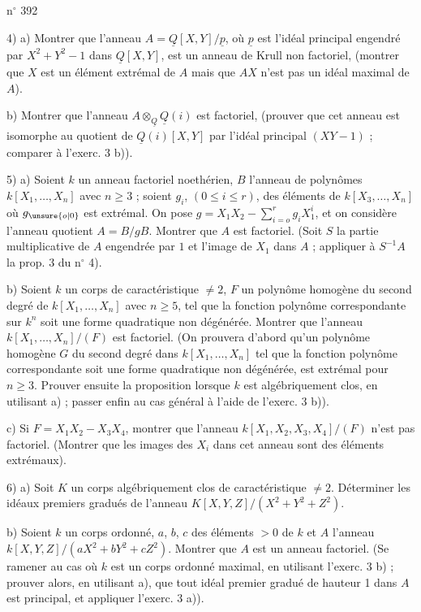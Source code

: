 \hfill n$^{\circ}$ 392

4) \qquad a) Montrer que l'anneau $A=\underline{Q}[X,Y]/\underline{p}$, où $\underline{p}$ est l'idéal principal engendré par $X^2+Y^2-1$ dans $\underline{Q}[X,Y]$, est un anneau de Krull non factoriel, (montrer que $X$ est un élément extrémal de $A$ mais que $AX$ n'est pas un idéal maximal de $A$).

b) Montrer que l'anneau $A\otimes_{\underline{Q}}\underline{Q}(i)$ est factoriel, (prouver que cet anneau est isomorphe au quotient de $\underline{Q}(i)[X,Y]$ par l'idéal principal $(XY-1)$ ; comparer à l'exerc. 3 b)).

5) \qquad a) Soient $k$ un anneau factoriel noethérien, $B$ l'anneau de polynômes $k[X_1,\ldots,X_n]$ avec $n\geq 3$ ; soient $g_i$, $(0\leq i\leq r)$, des éléments de $k[X_3,\ldots,X_n]$ où $g_{\unsure{o|0}}$ est extrémal. On pose $g=X_1X_2-\sum_{i=o}^{r}g_iX_1^{i}$, et on considère l'anneau quotient $A=B/gB$. Montrer que $A$ est factoriel. (Soit $S$ la partie multiplicative de $A$ engendrée par $1$ et l'image de $X_1$ dans $A$ ; appliquer à $S^{-1}A$ la prop. 3 du n$^{\circ}$ 4).

b) Soient $k$ un corps de caractéristique $\ne 2$, $F$ un polynôme homogène du second degré de $k[X_1,\ldots,X_n]$ avec $n\geq 5$, tel que la fonction polynôme correspondante sur $k^n$ soit une forme quadratique non dégénérée. Montrer que l'anneau $k[X_1,\ldots,X_n]/(F)$ est factoriel. (On prouvera d'abord qu'un polynôme homogène $G$ du second degré dans $k[X_1,\ldots,X_n]$ tel que la fonction polynôme correspondante soit une forme quadratique non dégénérée, est extrémal pour $n\geq 3$. Prouver ensuite la proposition lorsque $k$ est algébriquement clos, en utilisant a) ; passer enfin au cas général à l'aide de l'exerc. 3 b)).

c) Si $F=X_1X_2-X_3X_4$, montrer que l'anneau $k[X_1,X_2,X_3,X_4]/(F)$ n'est pas factoriel. (Montrer que les images des $X_i$ dans cet anneau sont des éléments extrémaux).

6) \qquad a) Soit $K$ un corps algébriquement clos de caractéristique $\ne 2$. Déterminer les idéaux premiers gradués de l'anneau $K[X,Y,Z]/(X^2+Y^2+Z^2)$.

b) Soient $k$ un corps ordonné, $a$, $b$, $c$ des éléments $>0$ de $k$ et $A$ l'anneau $k[X,Y,Z]/(aX^2+bY^2+cZ^2)$. Montrer que $A$ est un anneau factoriel. (Se ramener au cas où $k$ est un corps ordonné maximal, en utilisant l'exerc. 3 b) ; prouver alors, en utilisant a), que tout idéal premier gradué de hauteur 1 dans $A$ est principal, et appliquer l'exerc. 3 a)).
